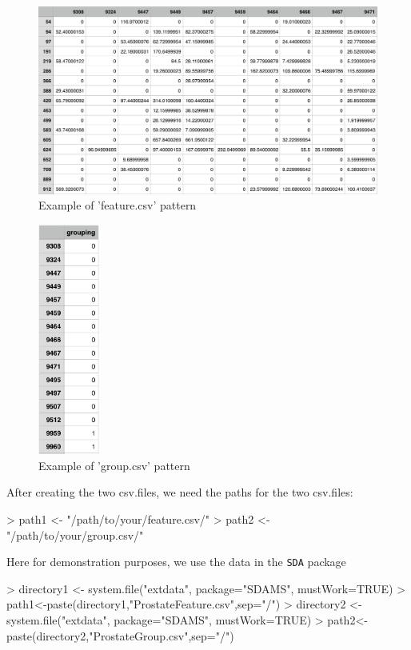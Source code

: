 \documentclass[12pt]{article}
\begin{document}
\begin{figure}[h!]
  \centering
  \includegraphics{feature.PNG}
  \caption{Example of 'feature.csv' pattern}
  \label{example feature}
\end{figure}
\begin{figure}[ht]
  \centering
  \includegraphics[width=2cm]{group.PNG}
  \caption{Example of 'group.csv' pattern}
  \label{example group}
\end{figure}


After creating the two csv.files, we need the paths for the two csv.files:

\begin{Schunk}
\begin{Sinput}
> path1 <- "/path/to/your/feature.csv/"
> path2 <- "/path/to/your/group.csv/"
\end{Sinput}
\end{Schunk}

Here for demonstration purposes, we use the data in the {\tt SDA} package

\begin{Schunk}
\begin{Sinput}
> directory1 <- system.file("extdata", package="SDAMS", mustWork=TRUE)
> path1<-paste(directory1,"ProstateFeature.csv",sep="/")
> directory2 <- system.file("extdata", package="SDAMS", mustWork=TRUE)
> path2<-paste(directory2,"ProstateGroup.csv",sep="/")
\end{Sinput}
\end{Schunk}
\end{document}
